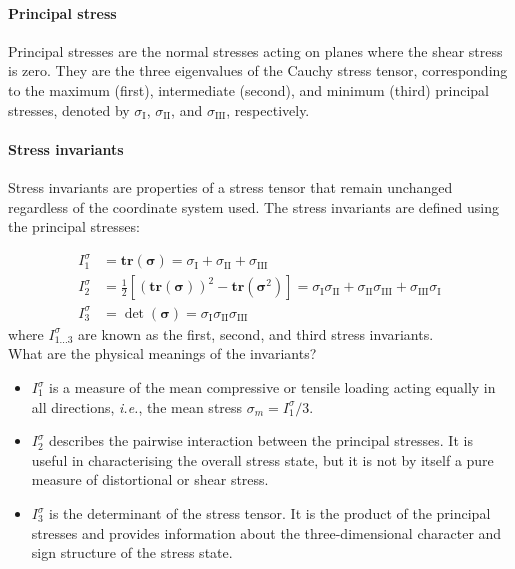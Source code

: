 \documentclass[12pt, a4paper]{article}
\numberwithin{equation}{section}
\begin{document}
\paragraph{Principal stress} Principal stresses are the normal stresses acting on planes where the shear stress is zero. They are the three eigenvalues of the Cauchy stress tensor, corresponding to the maximum (first), intermediate (second), and minimum (third) principal stresses, denoted by $\sigma_{\mathrm{I}}$, $\sigma_{\mathrm{II}}$, and $\sigma_{\mathrm{III}}$, respectively.


\paragraph{Stress invariants} Stress invariants are properties of a stress tensor that remain unchanged regardless of the coordinate system used. The stress invariants are defined using the principal stresses:

\begin{align}
    I_1^\sigma & = \mathbf{tr} (\boldsymbol{\sigma}) = \sigma_{\mathrm{I}} + \sigma_{\mathrm{II}} + \sigma_{\mathrm{III}} \\
    I_2^\sigma & = \frac{1}{2} \left[ (\mathbf{tr} (\boldsymbol{\sigma}))^2 - \mathbf{tr} (\boldsymbol{\sigma}^2) \right] = \sigma_{\mathrm{I}} \sigma_{\mathrm{II}} + \sigma_{\mathrm{II}} \sigma_{\mathrm{III}} + \sigma_{\mathrm{III}} \sigma_{\mathrm{I}} \\
    I_3^\sigma & = \det (\boldsymbol{\sigma}) = \sigma_{\mathrm{I}} \sigma_{\mathrm{II}} \sigma_{\mathrm{III}}
\end{align}
where $I_{1...3}^\sigma$ are known as the first, second, and third stress invariants.\\

What are the physical meanings of the invariants?
\begin{itemize}
    \item $I_1^\sigma$ is a measure of the mean compressive or tensile loading acting equally in all directions, \textit{i.e.}, the mean stress $\sigma_m = I_1^\sigma/3$.

    \item $I_2^\sigma$ describes the pairwise interaction between the principal stresses. It is useful in characterising the overall stress state, but it is not by itself a pure measure of distortional or shear stress.

    \item $I_3^\sigma$ is the determinant of the stress tensor. It is the product of the principal stresses and provides information about the three-dimensional character and sign structure of the stress state.
\end{itemize}
\end{document}
